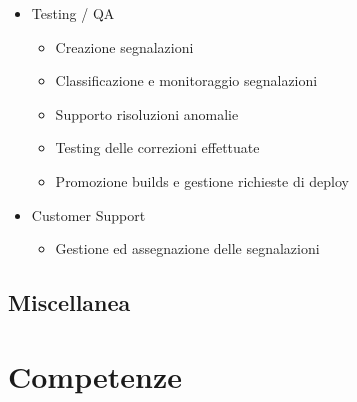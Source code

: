 \documentclass[11pt,a4paper,sans]{moderncv} %
\begin{document}
{\begin{itemize}
\begin{itemize}
	\end{itemize}
\item Testing / QA
	\begin{itemize}
	\item Creazione segnalazioni
	\item Classificazione e monitoraggio segnalazioni
	\item Supporto risoluzioni anomalie
	\item Testing delle correzioni effettuate
	\item Promozione builds e gestione richieste di deploy
	\end{itemize}
\item Customer Support
	\begin{itemize}
	\item Gestione ed assegnazione delle segnalazioni
	\end{itemize}
\end{itemize}}





\subsection{Miscellanea}




\section{Competenze}

\end{document}
